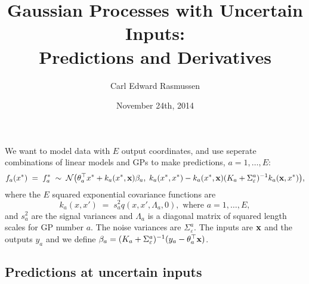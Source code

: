 \documentclass{article}
\title{Gaussian Processes with Uncertain Inputs:\\ Predictions and Derivatives}
\author{Carl Edward Rasmussen}
\date{November 24th, 2014}
\newcommand{\bfx}{{\bf x}}
\begin{document}
\maketitle


We want to model data with $E$ output coordinates, and use seperate
combinations of linear models and GPs to make predictions,
$a=1,\ldots,E$:
\[
f_a(x^*)\;=\;f_a^*\;\sim\;{\cal N}\big(\theta_a^\top x^*+k_a(x^*,\bfx)\beta_a,\;
k_a(x^*,x^*)-k_a(x^*,\bfx)(K_a+\Sigma_\varepsilon^a)^{-1}k_a(\bfx,x^*)\big),
\]
where the $E$ squared exponential covariance functions are
\begin{equation}
k_a(x,x')\;=\;s_a^2q(x, x',\Lambda_a,0), \text{\ \ where\ \ }a=1,\ldots,E,
\end{equation}
and $s_a^2$ are the signal variances and $\Lambda_a$ is a diagonal
matrix of squared length scales for GP number $a$. The noise variances
are $\Sigma_\varepsilon^a$. The inputs are $\bfx$ and the outputs
$y_a$ and we define $\beta_a=(K_a+\Sigma_\varepsilon^a)^{-1}(y_a-\theta_a^\top\bfx)$.


\subsection*{Predictions at uncertain inputs}
\end{document}
